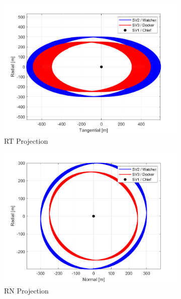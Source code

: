 \begin{figure}[H]
    \centering
    \begin{subfigure}[b]{0.32\linewidth}
        \includegraphics[width=\linewidth]{sim/figures/PS5/mode_1_RTN.png_RT.png}
        \caption{RT Projection}
        \label{fig:mode_1_rt}
    \end{subfigure}
    \begin{subfigure}[b]{0.32\linewidth}
        \includegraphics[width=\linewidth]{sim/figures/PS5/mode_1_RTN.png_RN.png}
        \caption{RN Projection}
        \label{fig:mode_1_rn}
    \end{subfigure}
    \begin{subfigure}[b]{0.32\linewidth}

\end{subfigure}
\end{figure}
